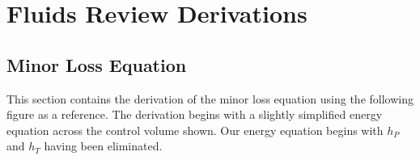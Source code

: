 \documentclass[letterpaper,10pt,english]{sphinxmanual}
\begin{document}
\chapter{Fluids Review Derivations}
\label{\detokenize{Fluids_Review/Fluids_Review_Derivations:fluids-review-derivations}}\label{\detokenize{Fluids_Review/Fluids_Review_Derivations:id1}}\label{\detokenize{Fluids_Review/Fluids_Review_Derivations::doc}}

\section{Minor Loss Equation}
\label{\detokenize{Fluids_Review/Fluids_Review_Derivations:minor-loss-equation}}\label{\detokenize{Fluids_Review/Fluids_Review_Derivations:minor-loss-equation-derivation}}
This section contains the derivation of the minor loss equation using the following figure as a reference. The derivation begins with a slightly simplified energy equation across the control volume shown. Our energy equation begins with \(h_P\) and \(h_T\) having been
eliminated.
\end{document}
